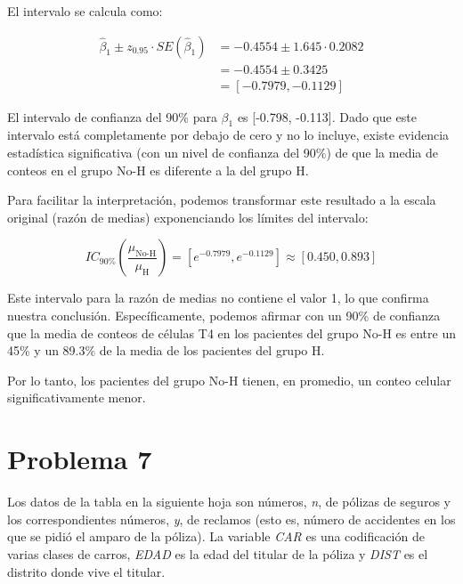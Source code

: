 \newpage
El intervalo se calcula como:

\begin{align*}
\widehat{\beta}_1 \pm z_{0.95} \cdot SE(\hat{\beta}_1) &= -0.4554 \pm 1.645 \cdot 0.2082 \\
&= -0.4554 \pm 0.3425 \\
&= [-0.7979, -0.1129]
\end{align*}

El intervalo de confianza del 90\% para $\beta_1$ es [-0.798, -0.113]. Dado que este intervalo está completamente por debajo de cero y no lo incluye, existe evidencia estadística significativa (con un nivel de confianza del 90\%) de que la media de conteos en el grupo No-H es diferente a la del grupo H.

Para facilitar la interpretación, podemos transformar este resultado a la escala original (razón de medias) exponenciando los límites del intervalo:

\begin{equation*}
    IC_{90\%}\left(\frac{\mu_{\text{No-H}}}{\mu_{\text{H}}}\right) = [e^{-0.7979}, e^{-0.1129}] \approx [0.450, 0.893]
\end{equation*}

\begin{center}
\end{center}

Este intervalo para la razón de medias no contiene el valor 1, lo que confirma nuestra conclusión. Específicamente, podemos afirmar con un 90\% de confianza que la media de conteos de células T4 en los pacientes del grupo No-H es entre un 45\% y un 89.3\% de la media de los pacientes del grupo H. 

\begin{tcolorbox}
Por lo tanto, los pacientes del grupo No-H tienen, en promedio, un conteo celular significativamente menor.
\end{tcolorbox}


\newpage

\section*{Problema \textcolor{CIMATRed}{7}}

Los datos de la tabla en la siguiente hoja son números, \textit{n}, de pólizas de seguros y los correspondientes números, \textit{y}, de reclamos (esto es, número de accidentes en los que se pidió el amparo de la póliza). La variable \textit{CAR} es una codificación de varias clases de carros, \textit{EDAD} es la edad del titular de la póliza y \textit{DIST} es el distrito donde vive el titular.

